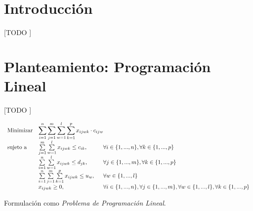 \documentclass{article}
\begin{document}
  \maketitle


  \section{Introducción}

    \paragraph{}
    [TODO ]

  \section{Planteamiento: Programación Lineal}

    \paragraph{}
    [TODO ]

    \begin{eqfloat}
      \begin{equation}
        \begin{array}{ll@{}ll}
          \text{Minimizar}	& \displaystyle \sum\limits_{i=1}^{n}\sum\limits_{j=1}^{m}\sum\limits_{w=1}^{l}\sum\limits_{k=1}^{p} x_{ijwk} \cdot c_{ijw} \\
          \text{sujeto a}		& \sum\limits_{j=1}^{m}\sum\limits_{w=1}^{l} x_{ijwk}	\leq c_{ik}, 		& \forall i \in \{1,...,n\}, \forall k \in \{1,...,p\}\\
                            &	\sum\limits_{i=1}^{n}\sum\limits_{w=1}^{l} x_{ijwk}	\leq d_{jk}, 		& \forall j \in \{1,...,m\}, \forall k \in \{1,...,p\}\\
                            &	\sum\limits_{i=1}^{n}\sum\limits_{j=1}^{m}\sum\limits_{k=1}^{p} x_{ijwk}	\leq u_{w}, 		& \forall w \in \{1,...,l\}\\
                            & x_{ijwk}	\geq 0, 	& \forall i \in \{1,...,n\}, \forall j \in \{1,...,m\}, \forall w \in \{1,...,l\}, \forall k \in \{1,...,p\}
        \end{array}
      \end{equation}
      \caption{Formulación como \emph{Problema de Programación Lineal}.}
      \label{eq:linear-programming-model}
    \end{eqfloat}
\end{document}
